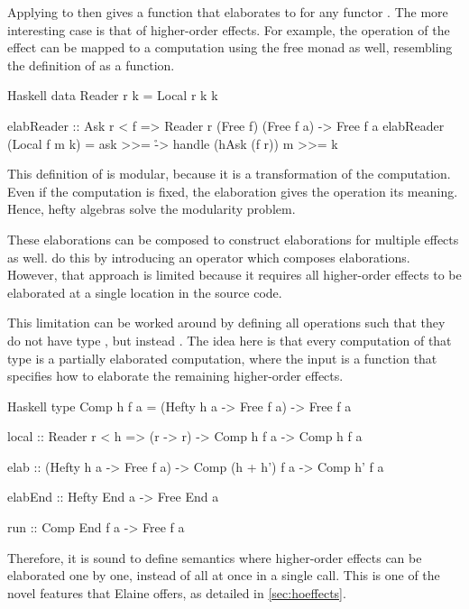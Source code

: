 Applying  to  then gives a function that elaborates  to  for any functor . The more interesting case is that of higher-order effects. For example, the  operation of the  effect can be mapped to a computation using the free monad as well, resembling the definition of  as a function.

\begin{lst}{Haskell}
data Reader r k = Local r k k

elabReader :: Ask r < f
           => Reader r (Free f) (Free f a)
           -> Free f a
elabReader (Local f m k) = ask >>= \r -> handle (hAsk (f r)) m >>= k
\end{lst}

This definition of  is modular, because it is a transformation of the computation. Even if the computation is fixed, the elaboration gives the  operation its meaning. Hence, hefty algebras solve the modularity problem.

These elaborations can be composed to construct elaborations for multiple effects as well. \textcite{bach_poulsen_hefty_2023} do this by introducing an operator which composes elaborations. However, that approach is limited because it requires all higher-order effects to be elaborated at a single location in the source code.

This limitation can be worked around by defining all operations such that they do not have type , but instead . The idea here is that every computation of that type is a partially elaborated computation, where the input is a function that specifies how to elaborate the remaining higher-order effects.

\begin{lst}{Haskell}
type Comp h f a = (Hefty h a -> Free f a) -> Free f a

local :: Reader r < h
      => (r -> r)
      -> Comp h f a
      -> Comp h f a

elab :: (Hefty h a -> Free f a)
     -> Comp (h + h') f a
     -> Comp h' f a

elabEnd :: Hefty End a -> Free End a

run :: Comp End f a -> Free f a
\end{lst}

Therefore, it is sound to define semantics where higher-order effects can be elaborated one by one, instead of all at once in a single  call. This is one of the novel features that Elaine offers, as detailed in \cref{sec:hoeffects}.
